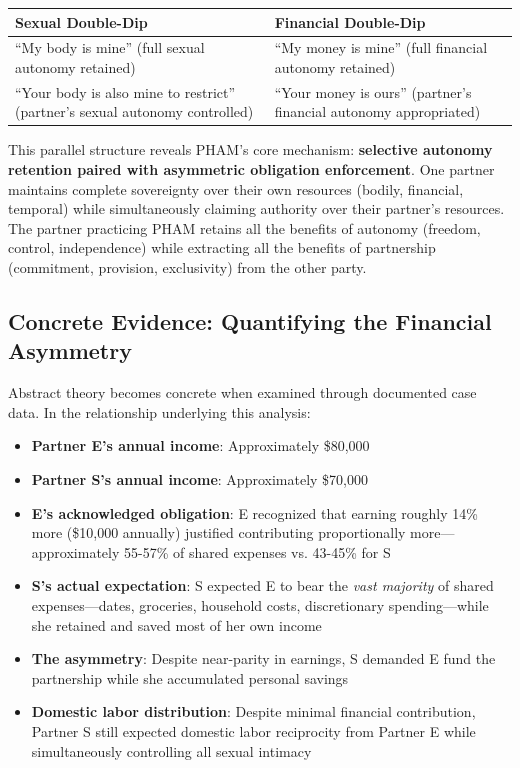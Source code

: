 \documentclass[12pt,openany]{book}
\numberwithin{equation}{chapter}
\begin{document}
\begin{center}
\begin{tabular}{|p{2.5in}|p{2.5in}|}
\hline
\textbf{Sexual Double-Dip} & \textbf{Financial Double-Dip} \\
\hline
``My body is mine'' (full sexual autonomy retained) & ``My money is mine'' (full financial autonomy retained) \\
\hline
``Your body is also mine to restrict'' (partner's sexual autonomy controlled) & ``Your money is ours'' (partner's financial autonomy appropriated) \\
\hline
\end{tabular}
\end{center}

This parallel structure reveals PHAM's core mechanism: \textbf{selective autonomy retention paired with asymmetric obligation enforcement}. One partner maintains complete sovereignty over their own resources (bodily, financial, temporal) while simultaneously claiming authority over their partner's resources. The partner practicing PHAM retains all the benefits of autonomy (freedom, control, independence) while extracting all the benefits of partnership (commitment, provision, exclusivity) from the other party.

\subsection{Concrete Evidence: Quantifying the Financial Asymmetry}

Abstract theory becomes concrete when examined through documented case data. In the relationship underlying this analysis:

\begin{itemize}
    \item \textbf{Partner E's annual income}: Approximately \$80,000
    \item \textbf{Partner S's annual income}: Approximately \$70,000
    \item \textbf{E's acknowledged obligation}: E recognized that earning roughly 14\% more (\$10,000 annually) justified contributing proportionally more---approximately 55-57\% of shared expenses vs. 43-45\% for S
    \item \textbf{S's actual expectation}: S expected E to bear the \textit{vast majority} of shared expenses---dates, groceries, household costs, discretionary spending---while she retained and saved most of her own income
    \item \textbf{The asymmetry}: Despite near-parity in earnings, S demanded E fund the partnership while she accumulated personal savings
    \item \textbf{Domestic labor distribution}: Despite minimal financial contribution, Partner S still expected domestic labor reciprocity from Partner E while simultaneously controlling all sexual intimacy
\end{itemize}
\end{document}
